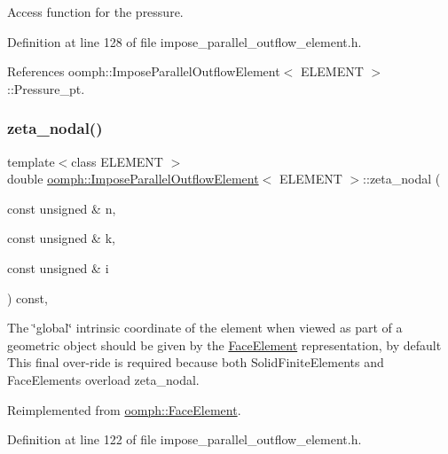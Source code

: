 Access function for the pressure. 



Definition at line 128 of file impose\+\_\+parallel\+\_\+outflow\+\_\+element.\+h.



References oomph\+::\+Impose\+Parallel\+Outflow\+Element$<$ E\+L\+E\+M\+E\+N\+T $>$\+::\+Pressure\+\_\+pt.

\mbox{\label{classoomph_1_1ImposeParallelOutflowElement_afa3691d3309b635967e81461b7db8173}} 
\subsubsection{\texorpdfstring{zeta\+\_\+nodal()}{zeta\_nodal()}}
{\footnotesize\ttfamily template$<$class E\+L\+E\+M\+E\+NT $>$ \\
double \hyperlink{classoomph_1_1ImposeParallelOutflowElement}{oomph\+::\+Impose\+Parallel\+Outflow\+Element}$<$ E\+L\+E\+M\+E\+NT $>$\+::zeta\+\_\+nodal (\begin{DoxyParamCaption}\item[{const unsigned \&}]{n,  }\item[{const unsigned \&}]{k,  }\item[{const unsigned \&}]{i }\end{DoxyParamCaption}) const\hspace{0.3cm}{\ttfamily [inline]}, {\ttfamily [virtual]}}



The \char`\"{}global\char`\"{} intrinsic coordinate of the element when viewed as part of a geometric object should be given by the \hyperlink{classoomph_1_1FaceElement}{Face\+Element} representation, by default This final over-\/ride is required because both Solid\+Finite\+Elements and Face\+Elements overload zeta\+\_\+nodal. 



Reimplemented from \hyperlink{classoomph_1_1FaceElement_a58c9f93705c7741f76c8487d152e68a6}{oomph\+::\+Face\+Element}.



Definition at line 122 of file impose\+\_\+parallel\+\_\+outflow\+\_\+element.\+h.



